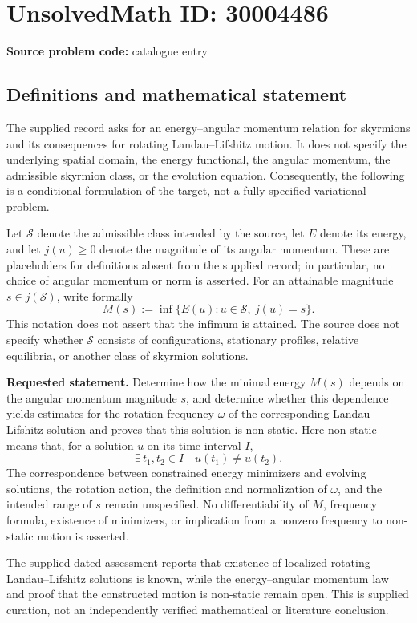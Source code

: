 \documentclass[11pt]{article}
\begin{document}
\section*{UnsolvedMath ID: 30004486}
\textbf{Source problem code:} catalogue entry
\subsection{Definitions and mathematical statement}
The supplied record asks for an energy--angular momentum relation for skyrmions and its consequences for rotating Landau--Lifshitz motion. It does not specify the underlying spatial domain, the energy functional, the angular momentum, the admissible skyrmion class, or the evolution equation. Consequently, the following is a conditional formulation of the target, not a fully specified variational problem.

Let \(\mathcal S\) denote the admissible class intended by the source, let \(E\) denote its energy, and let \(j(u)\geq 0\) denote the magnitude of its angular momentum. These are placeholders for definitions absent from the supplied record; in particular, no choice of angular momentum or norm is asserted. For an attainable magnitude \(s\in j(\mathcal S)\), write formally
\[
M(s):=\inf\{E(u):u\in\mathcal S,\ j(u)=s\}.
\]
This notation does not assert that the infimum is attained. The source does not specify whether \(\mathcal S\) consists of configurations, stationary profiles, relative equilibria, or another class of skyrmion solutions.

\textbf{Requested statement.} Determine how the minimal energy \(M(s)\) depends on the angular momentum magnitude \(s\), and determine whether this dependence yields estimates for the rotation frequency \(\omega\) of the corresponding Landau--Lifshitz solution and proves that this solution is non-static. Here non-static means that, for a solution \(u\) on its time interval \(I\),
\[
\exists\,t_1,t_2\in I\quad u(t_1)\ne u(t_2).
\]
The correspondence between constrained energy minimizers and evolving solutions, the rotation action, the definition and normalization of \(\omega\), and the intended range of \(s\) remain unspecified. No differentiability of \(M\), frequency formula, existence of minimizers, or implication from a nonzero frequency to non-static motion is asserted.

The supplied dated assessment reports that existence of localized rotating Landau--Lifshitz solutions is known, while the energy--angular momentum law and proof that the constructed motion is non-static remain open. This is supplied curation, not an independently verified mathematical or literature conclusion.
\end{document}
